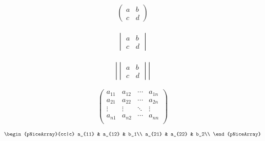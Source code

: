 \documentclass[a4paper, 12pt]{article}
\begin{document}
    \begin{align*}
        \begin{pmatrix} %
            a & b\\
            c & d
        \end{pmatrix}
    \end{align*}

    \begin{align*}
        \begin{vmatrix} %
            a & b\\
            c & d
        \end{vmatrix}
    \end{align*}

    \begin{align*}
        \left|\begin{vmatrix} %
            a & b\\
            c & d
        \end{vmatrix}\right|
    \end{align*}

    \[ %
        \begin{pmatrix} %
            a_{11} & a_{12} & \cdots & a_{1n}\\ %
            a_{21} & a_{22} & \cdots & a_{2n}\\
            \vdots & \vdots & \ddots & \vdots\\
            a_{n1} & a_{n2} & \cdots & a_{nn}\\
        \end{pmatrix}
    \]

    \begin{align*}
        \begin{pNiceArray}{cc|c} %
            a_{11} & a_{12} & b_1\\
            a_{21} & a_{22} & b_2\\
        \end{pNiceArray}
    \end{align*}
\end{document}
